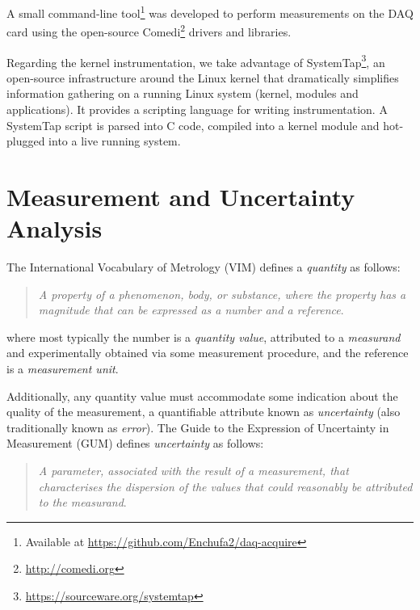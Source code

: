 \documentclass[twoside,nohyper]{tufte-book}
\theoremstyle{definition}
\theoremstyle{definition}
\theoremstyle{definition}
\theoremstyle{remark}
\begin{document}
A small command-line tool\footnote{Available at
  \url{https://github.com/Enchufa2/daq-acquire}} was developed to
perform measurements on the DAQ card using the open-source
Comedi\footnote{\url{http://comedi.org}} drivers and libraries.

Regarding the kernel instrumentation, we take advantage of
SystemTap\footnote{\href{(https://sourceware.org/systemtap)}{https://sourceware.org/systemtap}},
an open-source infrastructure around the Linux kernel that dramatically
simplifies information gathering on a running Linux system (kernel,
modules and applications). It provides a scripting language for writing
instrumentation. A SystemTap script is parsed into C code, compiled into
a kernel module and hot-plugged into a live running system.

\hypertarget{measurement-and-uncertainty-analysis}{%
\section{Measurement and Uncertainty
Analysis}\label{measurement-and-uncertainty-analysis}}

The International Vocabulary of Metrology (VIM) defines a
\emph{quantity} as
follows\cite[0pt]{VIM:2012}:

\begin{quote}
\emph{A property of a phenomenon, body, or substance, where the property
has a magnitude that can be expressed as a number and a reference}.
\end{quote}

\noindent where most typically the number is a \emph{quantity value},
attributed to a \emph{measurand} and experimentally obtained via some
measurement procedure, and the reference is a \emph{measurement unit}.

Additionally, any quantity value must accommodate some indication about
the quality of the measurement, a quantifiable attribute known as
\emph{uncertainty} (also traditionally known as \emph{error}). The Guide
to the Expression of Uncertainty in Measurement (GUM) defines
\emph{uncertainty} as
follows\cite[0pt]{GUM:2008}:


\begin{quote}
\emph{A parameter, associated with the result of a measurement, that
characterises the dispersion of the values that could reasonably be
attributed to the measurand}.
\end{quote}
\end{document}
